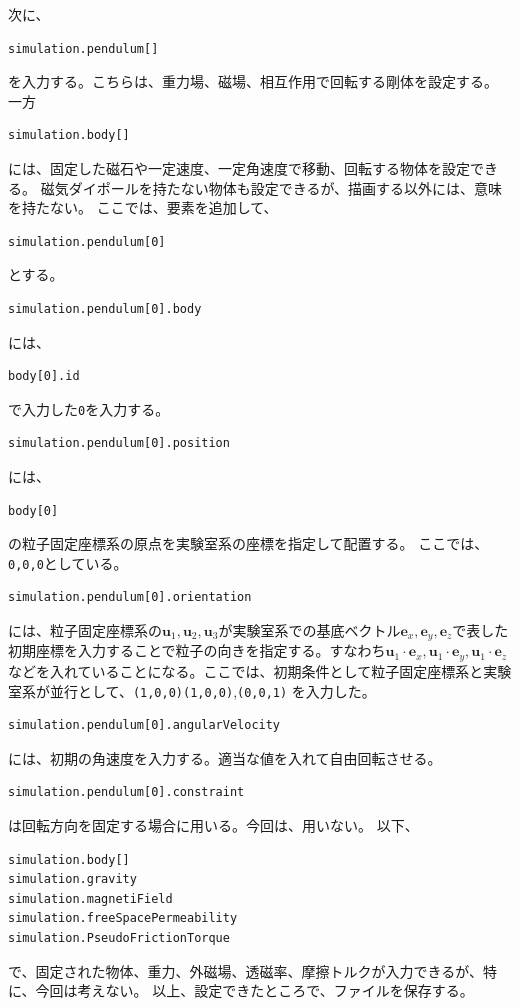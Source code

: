 \documentclass[a4paper,11pt]{jarticle}
\begin{document}
次に、
\begin{verbatim}
simulation.pendulum[]
\end{verbatim}
を入力する。こちらは、重力場、磁場、相互作用で回転する剛体を設定する。
一方
\begin{verbatim}
simulation.body[]
\end{verbatim}
には、固定した磁石や一定速度、一定角速度で移動、回転する物体を設定できる。
磁気ダイポールを持たない物体も設定できるが、描画する以外には、意味を持たない。
ここでは、要素を追加して、
\begin{verbatim}
simulation.pendulum[0]
\end{verbatim}
とする。
\begin{verbatim}
simulation.pendulum[0].body
\end{verbatim}
には、
\begin{verbatim}
body[0].id
\end{verbatim}
で入力した\verb|0|を入力する。
\begin{verbatim}
simulation.pendulum[0].position
\end{verbatim}
には、
\begin{verbatim}
body[0]
\end{verbatim}
の粒子固定座標系の原点を実験室系の座標を指定して配置する。
ここでは、\verb|0,0,0|としている。
\begin{verbatim}
simulation.pendulum[0].orientation
\end{verbatim}
には、粒子固定座標系の$\bm{u}_1,\bm{u}_2,\bm{u}_3$が実験室系での基底ベクトル$\bm{e}_x,\bm{e}_y,\bm{e}_z$で表した初期座標を入力することで粒子の向きを指定する。すなわち$\bm{u}_1\cdot\bm{e}_x,\bm{u}_1\cdot\bm{e}_y,\bm{u}_1\cdot\bm{e}_z$などを入れていることになる。ここでは、初期条件として粒子固定座標系と実験室系が並行として、\verb|(1,0,0)|\verb|(1,0,0)|,\verb|(0,0,1)|
を入力した。
\begin{verbatim}
simulation.pendulum[0].angularVelocity
\end{verbatim}
には、初期の角速度を入力する。適当な値を入れて自由回転させる。
\begin{verbatim}
simulation.pendulum[0].constraint
\end{verbatim}
は回転方向を固定する場合に用いる。今回は、用いない。
以下、
\begin{verbatim}
simulation.body[]
simulation.gravity
simulation.magnetiField
simulation.freeSpacePermeability
simulation.PseudoFrictionTorque
\end{verbatim}
で、固定された物体、重力、外磁場、透磁率、摩擦トルクが入力できるが、特に、今回は考えない。
以上、設定できたところで、ファイルを保存する。
\end{document}
